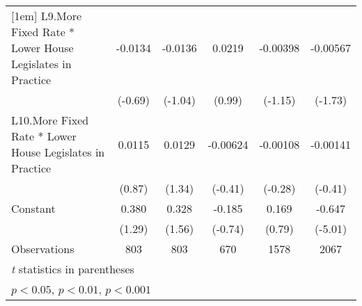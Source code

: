 {\begin{longtable}{l*{5}{c}}
[1em]
L9.More Fixed Rate * Lower House Legislates in Practice&  -0.0134         &  -0.0136         &   0.0219         & -0.00398         & -0.00567         \\
                &  (-0.69)         &  (-1.04)         &   (0.99)         &  (-1.15)         &  (-1.73)         \\
[1em]
L10.More Fixed Rate * Lower House Legislates in Practice&   0.0115         &   0.0129         & -0.00624         & -0.00108         & -0.00141         \\
                &   (0.87)         &   (1.34)         &  (-0.41)         &  (-0.28)         &  (-0.41)         \\
[1em]
Constant        &    0.380         &    0.328         &   -0.185         &    0.169         &   -0.647\sym{***}\\
                &   (1.29)         &   (1.56)         &  (-0.74)         &   (0.79)         &  (-5.01)         \\
\hline
Observations    &      803         &      803         &      670         &     1578         &     2067         \\
\hline\hline
\multicolumn{6}{l}{\footnotesize \textit{t} statistics in parentheses}\\
\multicolumn{6}{l}{\footnotesize \sym{*} \(p<0.05\), \sym{**} \(p<0.01\), \sym{***} \(p<0.001\)}\\
\end{longtable}
}
